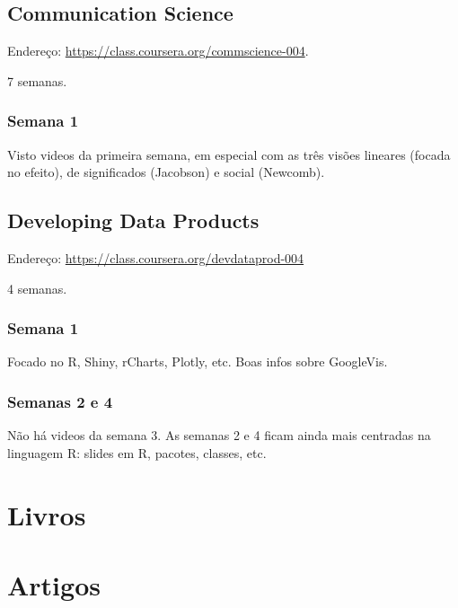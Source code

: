 \documentclass[12pt]{report}
\begin{document}
\section{Communication Science}
Endereço: \url{https://class.coursera.org/commscience-004}.

7 semanas.
\subsection{Semana 1}
Visto videos da primeira semana, em especial com as três visões lineares (focada no efeito), de significados (Jacobson) e social (Newcomb).
\section{Developing Data Products}
Endereço: \url{https://class.coursera.org/devdataprod-004}

4 semanas.
\subsection{Semana 1}
Focado no R, Shiny, rCharts, Plotly, etc. Boas infos sobre GoogleVis.
\subsection{Semanas 2 e 4}
Não há videos da semana 3. As semanas 2 e 4 ficam ainda mais centradas na linguagem R: slides em R, pacotes, classes, etc.
\chapter{Livros}
\chapter{Artigos}
\newpage

\newpage

\newpage
\printindex
\newpage
%
\appendix
\end{document}
